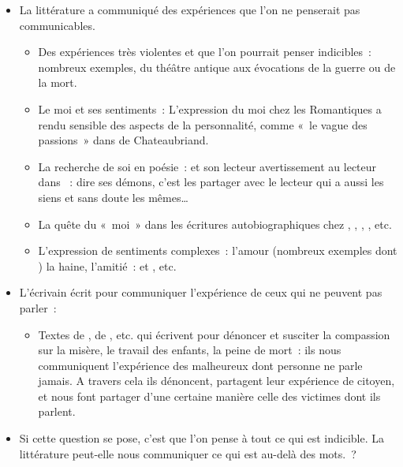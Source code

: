 {\begin{itemize}[label=\textbullet]
\item La littérature a communiqué des expériences que l'on ne penserait pas communicables.
\begin{itemize}[label=$\circ$]
\item Des expériences très violentes et que l'on pourrait penser indicibles~: nombreux
exemples, du théâtre antique aux évocations de la guerre ou de la mort.
\item Le moi et ses sentiments~: L'expression du moi chez les Romantiques a rendu sensible
des aspects de la personnalité, comme «~le vague des passions~» dans  de
Chateaubriand.
\item La recherche de soi en poésie~:  et son lecteur avertissement au lecteur dans
~: dire ses démons, c'est les partager avec le lecteur qui a aussi les
siens et sans doute les mêmes…
\item La quête du «~moi~» dans les écritures autobiographiques chez , ,
, , etc.
\item L'expression de sentiments complexes~: l'amour (nombreux exemples dont ) la haine, l'amitié~:  et , etc.
\end{itemize}
\item L'écrivain écrit pour communiquer l'expérience de ceux qui ne peuvent pas parler~:
\begin{itemize}[label=$\circ$]
\item Textes de , de , etc. qui écrivent pour dénoncer et susciter la compassion
sur la misère, le travail des enfants, la peine de mort~: ils nous communiquent
l'expérience des malheureux dont personne ne parle jamais. A travers cela ils
dénoncent, partagent leur expérience de citoyen, et nous font partager d'une certaine
manière celle des victimes dont ils parlent.
\end{itemize}
\item Si cette question se pose, c'est que l'on pense à tout ce qui est indicible. La littérature
peut-elle nous communiquer ce qui est au-delà des mots.~?
\begin{itemize}[label=$\circ$]

\end{itemize}
\end{itemize}}
